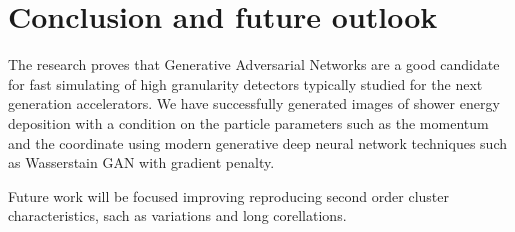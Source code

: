 \section{Conclusion and future outlook}\label{conclusion}

The research proves that Generative Adversarial Networks are a good candidate for fast simulating of high granularity detectors typically studied for the next generation accelerators. We have successfully generated images of shower energy deposition with a condition on the particle parameters such as the momentum and the coordinate using modern generative deep neural network techniques such as Wasserstain GAN with gradient penalty.

Future work will be focused improving reproducing second order cluster characteristics, sach as variations and long corellations. 